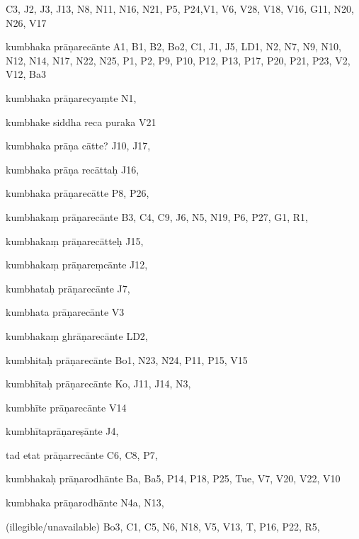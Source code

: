 \begin{ekdosis}
\begin{marma}[hp01_055]
\begin{marma}[hp02_009]
\begin{marma}[hp02_011]
\begin{marma}[hp02_73b]
\begin{description}
    \end{description}
 \end{marma}

\begin{marma}[hp02_78a]
 C3, J2, J3, J13, N8, N11, N16, N21, P5, P24,V1, V6, V28, V18, V16, G11,
 N20, N26, V17
\item[kumbhaka prāṇarecānte] A1, B1, B2, Bo2, C1, J1, J5, LD1, N2, N7, N9, N10, N12, N14, N17, N22, N25, P1, P2, P9, P10, P12, P13, P17, P20, P21, P23, V2, V12, Ba3
\item[kumbhaka prāṇarecyaṃte] N1,
\item[kumbhake siddha reca puraka] V21
\item[kumbhaka prāṇa cātte?] J10, J17, 
\item[kumbhaka prāṇa recāttaḥ] J16,
\item[kumbhaka prāṇarecātte] P8, P26,
\item[kumbhakaṃ prāṇarecānte] B3, C4, C9, J6, N5, N19, P6, P27, G1, R1, 
\item[kumbhakaṃ prāṇarecātteḥ] J15,
\item[kumbhakaṃ prāṇareṃcānte] J12,
\item[kumbhataḥ prāṇarecānte] J7,
\item[kumbhata prāṇarecānte] V3
\item[kumbhakaṃ ghrāṇarecānte] LD2, 
\item[kumbhitaḥ prāṇarecānte] Bo1, N23, N24, P11, P15, V15
\item[kumbhītaḥ prāṇarecānte] Ko, J11, J14, N3,  
\item[kumbhīte prāṇarecānte] V14
\item[kumbhītaprāṇareṣānte] J4,
\item[tad etat prāṇarrecānte] C6, C8, P7, 
\item[kumbhakaḥ prāṇarodhānte] Ba, Ba5, P14, P18, P25, Tue, V7, V20, V22, V10
\item[kumbhaka prāṇarodhānte] N4a, N13,
\item[(illegible/unavailable)] Bo3, C1, C5, N6, N18, V5, V13, T, P16, P22, R5,
  \begin{description}

    \end{description}
 \end{marma}

\end{ekdosis}











